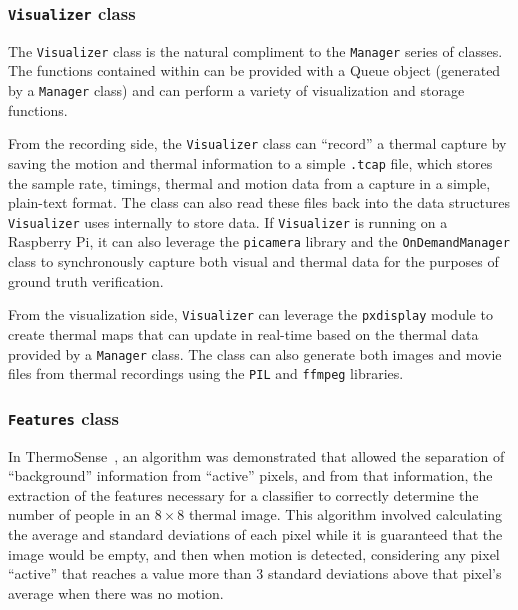 \documentclass[../thesis/thesis.tex]{subfiles}
\begin{document}
\subsubsection*{\texttt{Visualizer} class}
The \texttt{Visualizer} class is the natural compliment to the \texttt{Manager} series of classes. The functions contained within can be provided with a Queue object (generated by a \texttt{Manager} class) and can perform a variety of visualization and storage functions.

From the recording side, the \texttt{Visualizer} class can ``record'' a thermal capture by saving the motion and thermal information to a simple \texttt{.tcap} file, which stores the sample rate, timings, thermal and motion data from a capture in a simple, plain-text format. The class can also read these files back into the data structures \texttt{Visualizer} uses internally to store data. If \texttt{Visualizer} is running on a Raspberry Pi, it can also leverage the \texttt{picamera} library and the \texttt{OnDemandManager} class to synchronously capture both visual and thermal data for the purposes of ground truth verification.

From the visualization side, \texttt{Visualizer} can leverage the \texttt{pxdisplay} module to create thermal maps that can update in real-time based on the thermal data provided by a \texttt{Manager} class. The class can also generate both images and movie files from thermal recordings using the \texttt{PIL} and \texttt{ffmpeg} libraries.

\subsubsection*{\texttt{Features} class}

In ThermoSense~\cite{beltran2013thermosense}, an algorithm was demonstrated that allowed the separation of ``background'' information from ``active'' pixels, and from that information, the extraction of the features necessary for a classifier to correctly determine the number of people in an $8\times8$ thermal image. This algorithm involved calculating the average and standard deviations of each pixel while it is guaranteed that the image would be empty, and then when motion is detected, considering any pixel ``active'' that reaches a value more than 3 standard deviations above that pixel's average when there was no motion.
\end{document}
